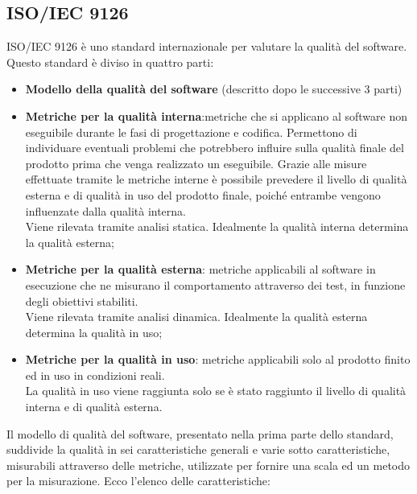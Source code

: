 	\subsection{ISO/IEC 9126}
	ISO/IEC 9126 è uno standard internazionale per valutare la qualità del software.\\%
	Questo standard è diviso in quattro parti:
	\begin{itemize}
		\item \textbf{Modello della qualità del software} (descritto dopo le successive 3 parti)
		\item \textbf{Metriche per la qualità interna}:metriche che si applicano al software non eseguibile durante le fasi di progettazione e codifica. Permettono di individuare eventuali problemi che potrebbero influire sulla qualità finale del prodotto prima che venga realizzato un eseguibile. Grazie alle misure effettuate tramite le metriche interne è possibile prevedere il livello di qualità esterna e di qualità in uso del prodotto finale, poiché entrambe vengono influenzate dalla qualità interna.\\
Viene rilevata tramite analisi statica. Idealmente la qualità interna determina la qualità esterna;
		\item \textbf{Metriche per la qualità esterna}: metriche applicabili al software in esecuzione che ne misurano il comportamento attraverso dei test, in funzione degli obiettivi stabiliti.\\
Viene rilevata tramite analisi dinamica. Idealmente la qualità esterna determina la qualità in uso;
		\item \textbf{Metriche per la qualità in uso}: metriche applicabili solo al prodotto finito ed in uso in condizioni reali.\\
La qualità in uso viene raggiunta solo se è stato raggiunto il livello di qualità interna e di qualità esterna.
	\end{itemize}
	Il modello di qualità del software, presentato nella prima parte dello standard, suddivide la qualità in sei caratteristiche generali e varie sotto caratteristiche, misurabili attraverso delle metriche, utilizzate per fornire una scala ed un metodo per la misurazione. Ecco l'elenco delle caratteristiche:
